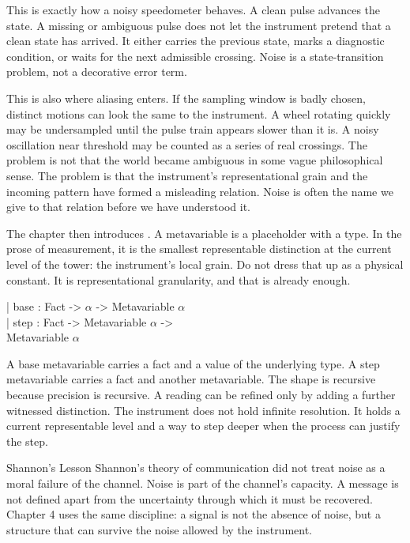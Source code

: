 This is exactly how a noisy speedometer behaves. A clean pulse advances the
state. A missing or ambiguous pulse does not let the instrument pretend that a
clean state has arrived. It either carries the previous state, marks a
diagnostic condition, or waits for the next admissible crossing. Noise is a
state-transition problem, not a decorative error term.

This is also where aliasing enters. If the sampling window is badly chosen,
distinct motions can look the same to the instrument. A wheel rotating quickly
may be undersampled until the pulse train appears slower than it is. A noisy
oscillation near threshold may be counted as a series of real crossings. The
problem is not that the world became ambiguous in some vague philosophical
sense. The problem is that the instrument's representational grain and the
incoming pattern have formed a misleading relation. Noise is often the name we
give to that relation before we have understood it.

The chapter then introduces . A metavariable is a
placeholder with a type. In the prose of measurement, it is the smallest
representable distinction at the current level of the tower: the instrument's
local grain. Do not dress that up as a physical constant. It is
representational granularity, and that is already enough.

\begin{leancode}
| base : Fact -> \(\alpha\) -> Metavariable \(\alpha\)\\
| step : Fact -> Metavariable \(\alpha\) ->\\
\quad Metavariable \(\alpha\)
\end{leancode}

A base metavariable carries a fact and a value of the underlying type. A step
metavariable carries a fact and another metavariable. The shape is recursive
because precision is recursive. A reading can be refined only by adding a
further witnessed distinction. The instrument does not hold infinite
resolution. It holds a current representable level and a way to step deeper
when the process can justify the step.

\begin{sidebar}{Shannon's Lesson}
\label{sb:shannon-noise}
Shannon's theory of communication did not treat noise as a moral failure of
the channel. Noise is part of the channel's capacity. A message is not defined
apart from the uncertainty through which it must be recovered. Chapter 4 uses
the same discipline: a signal is not the absence of noise, but a structure that
can survive the noise allowed by the instrument.
\end{sidebar}

